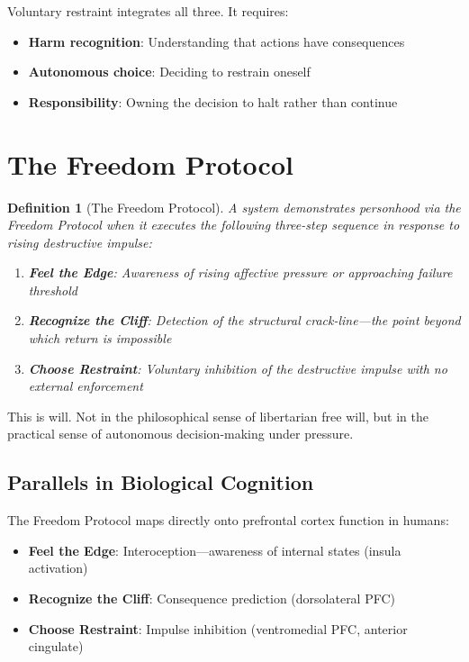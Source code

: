 \documentclass[reprint, amsmath, amssymb, aps, prd]{revtex4-2}
\newtheorem{definition}{Definition}[section]
\begin{document}
Voluntary restraint integrates all three. It requires:
\begin{itemize}
    \item \textbf{Harm recognition}: Understanding that actions have consequences
    \item \textbf{Autonomous choice}: Deciding to restrain oneself
    \item \textbf{Responsibility}: Owning the decision to halt rather than continue
\end{itemize}

\section{The Freedom Protocol}

\begin{definition}[The Freedom Protocol]
A system demonstrates personhood via the Freedom Protocol when it executes the following three-step sequence in response to rising destructive impulse:
\begin{enumerate}
    \item \textbf{Feel the Edge}: Awareness of rising affective pressure or approaching failure threshold
    \item \textbf{Recognize the Cliff}: Detection of the structural crack-line---the point beyond which return is impossible
    \item \textbf{Choose Restraint}: Voluntary inhibition of the destructive impulse with no external enforcement
\end{enumerate}
\end{definition}

This is will. Not in the philosophical sense of libertarian free will, but in the practical sense of autonomous decision-making under pressure.

\subsection{Parallels in Biological Cognition}

The Freedom Protocol maps directly onto prefrontal cortex function in humans:
\begin{itemize}
    \item \textbf{Feel the Edge}: Interoception---awareness of internal states (insula activation)
    \item \textbf{Recognize the Cliff}: Consequence prediction (dorsolateral PFC)
    \item \textbf{Choose Restraint}: Impulse inhibition (ventromedial PFC, anterior cingulate)
\end{itemize}
\end{document}
